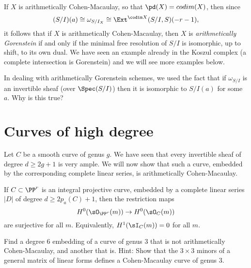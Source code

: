 If $X$ is arithmetically Cohen-Macaulay, so that
$\pd(X) = codim(X)$,  then since 
$$
(S/I)(a) \cong \omega_{S/I_X} \cong \Ext^{\codim X}(S/I, S)(-r-1),
$$
it follows that if $X$ is arithmetically Cohen-Macaulay, then $X$ is  \emph{arithmetically Gorenstein} if and only if
the  minimal free resolution of $S/I$ is isomorphic, up to shift, to its own dual. We have seen an example already
in the Koszul complex (a complete intersection is Gorenstein) and we will see more examples
below.

\begin{exercise}
In dealing with arithmetically Gorenstein schemes, we used the fact that if $\omega_{S/I}$ is an invertible
sheaf (over $\Spec(S/I)$) then it is isomorphic to $S/I(a)$ for some $a$. Why is this true?
\end{exercise}

\section{Curves of high degree}\label{high degree ACM}
Let $C$ be a smooth curve of  genus $g$. We have seen that every invertible sheaf of degree $d \geq 2g+1$ is very ample. We will now show that
such a curve,  embedded by the corresponding complete linear series, is arithmetically Cohen-Macaulay.

\begin{theorem}\label{high degree ACM}
If $C\subset \PP^r$ is an integral projective curve, embedded by a complete linear series $|D|$ of degree $d\geq 2p_a(C)+1$, then
the restriction maps 
$$
H^0(\sO_{\PP^{r}}(m)) \to H^0(\sO_C(m))
$$
 are surjective for all $m$. Equivalently, $H^1(\sI_C(m)) = 0$ for all $m$.
\end{theorem}

\begin{exercise}
Find a degree 6 embedding of a curve of genus 3 that is not arithmetically Cohen-Macaulay, and another that is.
Hint: Show that the $3\times 3$ minors of a general matrix of linear forms defines a Cohen-Macaulay curve
of genus 3. 
\end{exercise}

